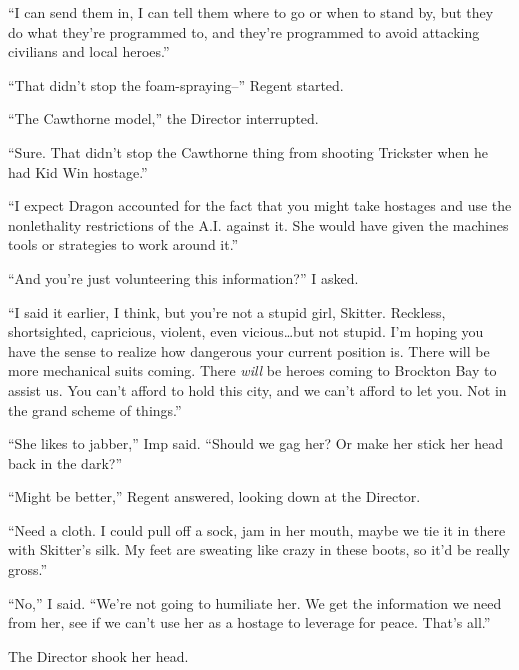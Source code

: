 ``I can send them in, I can tell them where to go or when to stand by, but they do what they're programmed to, and they're programmed to avoid attacking civilians and local heroes.''



``That didn't stop the foam-spraying--''  Regent started.



``The Cawthorne model,'' the Director interrupted.



``Sure.  That didn't stop the Cawthorne thing from shooting Trickster when he had Kid Win hostage.''



``I expect Dragon accounted for the fact that you might take hostages and use the nonlethality restrictions of the A.I. against it.  She would have given the machines tools or strategies to work around it.''



``And you're just volunteering this information?'' I asked.



``I said it earlier, I think, but you're not a stupid girl, Skitter.  Reckless, shortsighted, capricious, violent, even vicious\ldots but not stupid.  I'm hoping you have the sense to realize how dangerous your current position is.  There will be more mechanical suits coming.  There \emph{will} be heroes coming to Brockton Bay to assist us.  You can't afford to hold this city, and we can't afford to let you.  Not in the grand scheme of things.''



``She likes to jabber,'' Imp said.  ``Should we gag her?  Or make her stick her head back in the dark?''



``Might be better,'' Regent answered, looking down at the Director.



``Need a cloth.  I could pull off a sock, jam in her mouth, maybe we tie it in there with Skitter's silk.  My feet are sweating like crazy in these boots, so it'd be really gross.''



``No,'' I said.  ``We're not going to humiliate her.  We get the information we need from her, see if we can't use her as a hostage to leverage for peace.  That's all.''



The Director shook her head.



